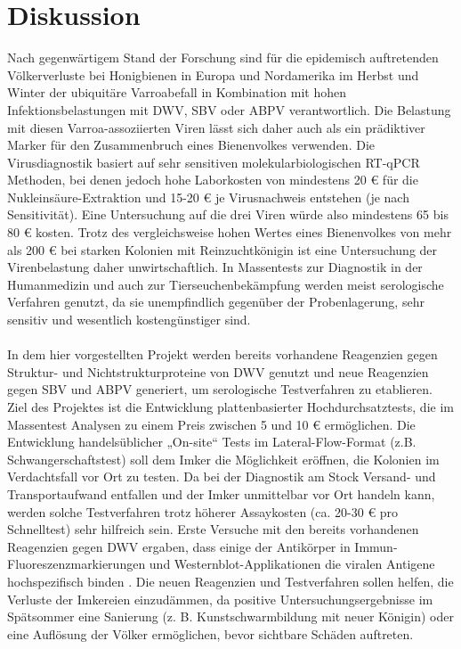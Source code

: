 \section{Diskussion}

Nach gegenwärtigem Stand der Forschung sind für die epidemisch auftretenden Völkerverluste bei Honigbienen in Europa und Nordamerika im Herbst und Winter der ubiquitäre Varroabefall in Kombination mit hohen Infektionsbelastungen mit DWV, SBV oder ABPV verantwortlich. Die Belastung mit diesen Varroa-assoziierten Viren lässt sich daher auch als ein prädiktiver Marker für den Zusammenbruch eines Bienenvolkes verwenden. Die Virusdiagnostik basiert auf sehr sensitiven molekularbiologischen RT-qPCR Methoden, bei denen jedoch hohe Laborkosten von mindestens 20 € für die Nukleinsäure-Extraktion und 15-20 € je Virusnachweis entstehen (je nach Sensitivität). Eine Untersuchung auf die drei Viren würde also mindestens 65 bis 80 € kosten. Trotz des vergleichsweise hohen Wertes eines Bienenvolkes von mehr als 200 € bei starken Kolonien mit Reinzuchtkönigin ist eine Untersuchung der Virenbelastung daher unwirtschaftlich. In Massentests zur Diagnostik in der Humanmedizin und auch zur Tierseuchenbekämpfung werden meist serologische Verfahren genutzt, da sie unempfindlich gegenüber der Probenlagerung, sehr sensitiv und wesentlich kostengünstiger sind. 
\\
\\
In dem hier vorgestellten Projekt werden bereits vorhandene Reagenzien gegen Struktur- und Nichtstrukturproteine von DWV genutzt und neue Reagenzien gegen SBV und ABPV generiert, um serologische Testverfahren zu etablieren. Ziel des Projektes ist die Entwicklung plattenbasierter Hochdurchsatztests, die im Massentest Analysen zu einem Preis zwischen 5 und 10 € ermöglichen. Die Entwicklung handelsüblicher „On-site“ Tests im Lateral-Flow-Format (z.B. Schwangerschaftstest) soll dem Imker die Möglichkeit eröffnen, die Kolonien im Verdachtsfall vor Ort zu testen. Da bei der Diagnostik am Stock Versand- und Transportaufwand entfallen und der Imker unmittelbar vor Ort handeln kann, werden solche Testverfahren trotz höherer Assaykosten (ca. 20-30 € pro Schnelltest) sehr hilfreich sein. Erste Versuche mit den bereits vorhandenen Reagenzien gegen DWV ergaben, dass einige der Antikörper in Immun-Fluoreszenzmarkierungen und Westernblot-Applikationen die viralen Antigene hochspezifisch binden \citep{Lamp2016}. Die neuen Reagenzien und Testverfahren sollen helfen, die Verluste der Imkereien einzudämmen, da positive Untersuchungsergebnisse im Spätsommer eine Sanierung (z. B. Kunstschwarmbildung mit neuer Königin) oder eine Auflösung der Völker ermöglichen, bevor sichtbare Schäden auftreten.
